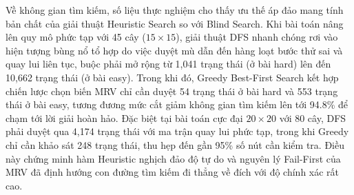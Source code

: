 \documentclass[a4paper,12pt]{article}
\begin{document}
\begin{table}[htbp]
\centering
\caption{Bảng tổng hợp số liệu thực nghiệm so sánh hiệu năng giữa DFS và Greedy}
\end{table}

Về không gian tìm kiếm, số liệu thực nghiệm cho thấy ưu thế áp đảo mang tính bản chất của giải thuật Heuristic Search so với Blind Search. Khi bài toán nâng lên quy mô phức tạp với 45 cây ($15\times 15$), giải thuật DFS nhanh chóng rơi vào hiện tượng bùng nổ tổ hợp do việc duyệt mù dẫn đến hàng loạt bước thử sai và quay lui liên tục, buộc phải mở rộng từ 1,041 trạng thái (ở bài hard) lên đến 10,662 trạng thái (ở bài easy). Trong khi đó, Greedy Best-First Search kết hợp chiến lược chọn biến MRV chỉ cần duyệt 54 trạng thái ở bài hard và 553 trạng thái ở bài easy, tương đương mức cắt giảm không gian tìm kiếm lên tới 94.8\% để chạm tới lời giải hoàn hảo. Đặc biệt tại bài toán cực đại $20\times 20$ với 80 cây, DFS phải duyệt qua 4,174 trạng thái với ma trận quay lui phức tạp, trong khi Greedy chỉ cần khảo sát 248 trạng thái, thu hẹp đến gần 95\% số nút cần kiểm tra. Điều này chứng minh hàm Heuristic nghịch đảo độ tự do và nguyên lý Fail-First của MRV đã định hướng con đường tìm kiếm đi thẳng về đích với độ chính xác rất cao.
\end{document}

